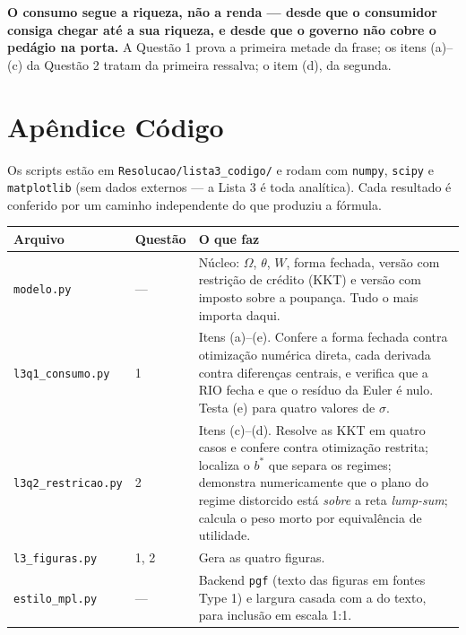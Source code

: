 \documentclass[11pt, a4paper]{article}
\newcommand{\stst}{^{\ast}}
\begin{document}
\begin{tcolorbox}[planbox, title={A frase que resume a lista}]
\small
\textbf{O consumo segue a riqueza, não a renda --- desde que o consumidor consiga chegar
até a sua riqueza, e desde que o governo não cobre o pedágio na porta.} A Questão 1 prova
a primeira metade da frase; os itens (a)--(c) da Questão 2 tratam da primeira ressalva; o
item (d), da segunda.
\end{tcolorbox}

\section*{Apêndice \quad Código}

Os scripts estão em \texttt{Resolucao/lista3\_codigo/} e rodam com \texttt{numpy},
\texttt{scipy} e \texttt{matplotlib} (sem dados externos --- a Lista 3 é toda analítica).
Cada resultado é conferido por um caminho independente do que produziu a fórmula.

\begin{center}
\small
\begin{tabular}{llp{7.0cm}}
\toprule
\textbf{Arquivo} & \textbf{Questão} & \textbf{O que faz} \\
\midrule
\texttt{modelo.py} & --- & Núcleo: $\Omega$, $\theta$, $W$, forma fechada, versão com
  restrição de crédito (KKT) e versão com imposto sobre a poupança. Tudo o mais importa
  daqui. \\
\texttt{l3q1\_consumo.py} & 1 & Itens (a)--(e). Confere a forma fechada contra otimização
  numérica direta, cada derivada contra diferenças centrais, e verifica que a RIO fecha e
  que o resíduo da Euler é nulo. Testa (e) para quatro valores de $\sigma$. \\
\texttt{l3q2\_restricao.py} & 2 & Itens (c)--(d). Resolve as KKT em quatro casos e confere
  contra otimização restrita; localiza o $b\stst$ que separa os regimes; demonstra
  numericamente que o plano do regime distorcido está \emph{sobre} a reta \emph{lump-sum};
  calcula o peso morto por equivalência de utilidade. \\
\texttt{l3\_figuras.py} & 1, 2 & Gera as quatro figuras. \\
\texttt{estilo\_mpl.py} & --- & Backend \texttt{pgf} (texto das figuras em fontes Type 1) e
  largura casada com a do texto, para inclusão em escala 1:1. \\
\bottomrule
\end{tabular}
\end{center}
\end{document}
